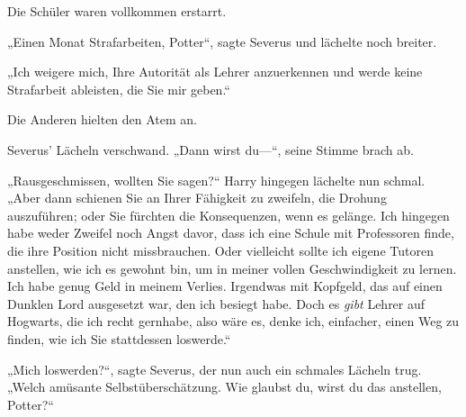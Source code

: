Die Schüler waren vollkommen erstarrt.

„Einen Monat Strafarbeiten, Potter“, sagte Severus und lächelte noch breiter.

„Ich weigere mich, Ihre Autorität als Lehrer anzuerkennen und werde keine Strafarbeit ableisten, die Sie mir geben.“

Die Anderen hielten den Atem an.

Severus’ Lächeln verschwand. „Dann wirst du—“, seine Stimme brach ab.

„Rausgeschmissen, wollten Sie sagen?“ Harry hingegen lächelte nun schmal. „Aber dann schienen Sie an Ihrer Fähigkeit zu zweifeln, die Drohung auszuführen; oder Sie fürchten die Konsequenzen, wenn es gelänge. Ich hingegen habe weder Zweifel noch Angst davor, dass ich eine Schule mit Professoren finde, die ihre Position nicht missbrauchen. Oder vielleicht sollte ich eigene Tutoren anstellen, wie ich es gewohnt bin, um in meiner vollen Geschwindigkeit zu lernen. Ich habe genug Geld in meinem Verlies. Irgendwas mit Kopfgeld, das auf einen Dunklen Lord ausgesetzt war, den ich besiegt habe. Doch es \emph{gibt} Lehrer auf Hogwarts, die ich recht gernhabe, also wäre es, denke ich, einfacher, einen Weg zu finden, wie ich Sie stattdessen loswerde.“

„Mich loswerden?“, sagte Severus, der nun auch ein schmales Lächeln trug. „Welch amüsante Selbstüberschätzung. Wie glaubst du, wirst du das anstellen, Potter?“

